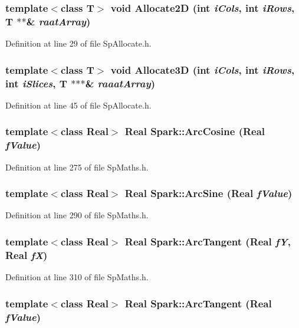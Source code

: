 \subsubsection{\setlength{\rightskip}{0pt plus 5cm}template$<$class T$>$ void Allocate2D (int {\em i\-Cols}, int {\em i\-Rows}, T $\ast$$\ast$\& {\em raat\-Array})}\label{namespaceSpark_a32}


Definition at line 29 of file Sp\-Allocate.h.
\subsubsection{\setlength{\rightskip}{0pt plus 5cm}template$<$class T$>$ void Allocate3D (int {\em i\-Cols}, int {\em i\-Rows}, int {\em i\-Slices}, T $\ast$$\ast$$\ast$\& {\em raaat\-Array})}\label{namespaceSpark_a34}


Definition at line 45 of file Sp\-Allocate.h.
\subsubsection{\setlength{\rightskip}{0pt plus 5cm}template$<$class Real$>$ Real Spark::Arc\-Cosine (Real {\em f\-Value})}\label{namespaceSpark_a61}


Definition at line 275 of file Sp\-Maths.h.
\subsubsection{\setlength{\rightskip}{0pt plus 5cm}template$<$class Real$>$ Real Spark::Arc\-Sine (Real {\em f\-Value})}\label{namespaceSpark_a62}


Definition at line 290 of file Sp\-Maths.h.
\subsubsection{\setlength{\rightskip}{0pt plus 5cm}template$<$class Real$>$ Real Spark::Arc\-Tangent (Real {\em f\-Y}, Real {\em f\-X})}\label{namespaceSpark_a64}


Definition at line 310 of file Sp\-Maths.h.
\subsubsection{\setlength{\rightskip}{0pt plus 5cm}template$<$class Real$>$ Real Spark::Arc\-Tangent (Real {\em f\-Value})}\label{namespaceSpark_a63}


